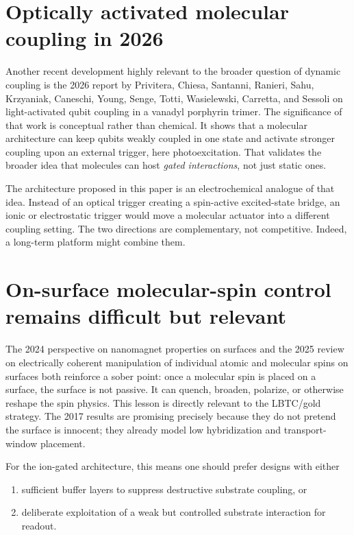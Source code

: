 \documentclass[11pt]{report}
\newcommand{\lbtc}{LBTC}
\theoremstyle{definition}
\begin{document}
\section{Optically activated molecular coupling in 2026}
Another recent development highly relevant to the broader question of dynamic coupling is the 2026 report by Privitera, Chiesa, Santanni, Ranieri, Sahu, Krzyaniak, Caneschi, Young, Senge, Totti, Wasielewski, Carretta, and Sessoli on light-activated qubit coupling in a vanadyl porphyrin trimer. The significance of that work is conceptual rather than chemical. It shows that a molecular architecture can keep qubits weakly coupled in one state and activate stronger coupling upon an external trigger, here photoexcitation. That validates the broader idea that molecules can host \emph{gated interactions}, not just static ones.

The architecture proposed in this paper is an electrochemical analogue of that idea. Instead of an optical trigger creating a spin-active excited-state bridge, an ionic or electrostatic trigger would move a molecular actuator into a different coupling setting. The two directions are complementary, not competitive. Indeed, a long-term platform might combine them.

\section{On-surface molecular-spin control remains difficult but relevant}
The 2024 perspective on nanomagnet properties on surfaces and the 2025 review on electrically coherent manipulation of individual atomic and molecular spins on surfaces both reinforce a sober point: once a molecular spin is placed on a surface, the surface is not passive. It can quench, broaden, polarize, or otherwise reshape the spin physics. This lesson is directly relevant to the \lbtc{}/gold strategy. The 2017 results are promising precisely because they do not pretend the surface is innocent; they already model low hybridization and transport-window placement.

For the ion-gated architecture, this means one should prefer designs with either

\begin{enumerate}[leftmargin=2em]
\item sufficient buffer layers to suppress destructive substrate coupling, or
\item deliberate exploitation of a weak but controlled substrate interaction for readout.
\end{enumerate}
\end{document}
